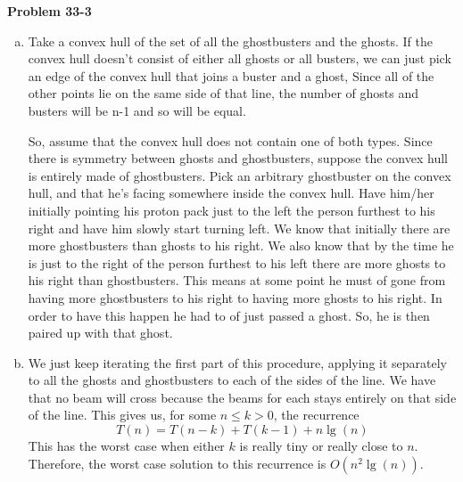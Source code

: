 \documentclass{article}
\begin{document}
\noindent\textbf{Problem 33-3}\\
\begin{enumerate}[a.]
\item
Take a convex hull of the set of all the ghostbusters and the ghosts. If the convex hull doesn't consist of either all ghosts or all busters, we can just pick an edge of the convex hull that joins a buster and a ghost, Since all of the other points lie on the same side of that line, the number of ghosts and busters will be n-1 and so will be equal.

So, assume that the convex hull does not contain one of both types. Since there is symmetry between ghosts and ghostbusters, suppose the convex hull is entirely made of ghostbusters. Pick an arbitrary ghostbuster on the convex hull, and that he's facing somewhere inside the convex hull. Have him/her initially pointing his proton pack just to the left the person furthest to his right and have him slowly start turning left. We know that initially there are more ghostbusters than ghosts to his right. We also know that by the time he is just to the right of the person furthest to his left there are more ghosts to his right than ghostbusters. This means at some point he must of gone from having more ghostbusters to his right to having more ghosts to his right. In order to have this happen he had to of just passed a ghost. So, he is then paired up with that ghost. 
\item
We just keep iterating the first part of this procedure, applying it separately to all the ghosts and ghostbusters to each of the sides of the line. We have that no beam will cross because the beams for each stays entirely on that side of the line. This gives us, for some $n\le k>0$, the recurrence
\[
T(n) = T(n-k) +T(k-1) + n\lg(n)
\]
This has the worst case when either $k$ is really tiny or really close to $n$. Therefore, the worst case solution to this recurrence is $O(n^2\lg(n))$.
\end{enumerate}
\end{document}
